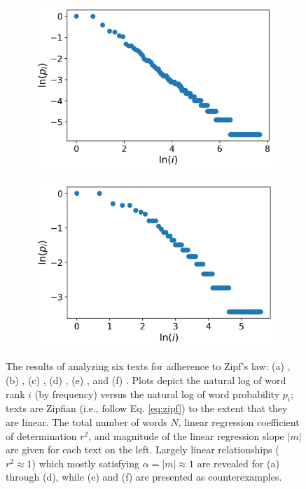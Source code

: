 \documentclass[10pt]{article}
\begin{document}
\begin{flushleft}
\begin{figure}[ht]
\begin{minipage}{0.65\linewidth}
\begin{subfigure}{0.32\linewidth}
            \includegraphics[width=0.99\linewidth]{images/parlost.png}
            \caption{}
        \end{subfigure}
        \begin{subfigure}{0.32\textwidth}
            \includegraphics[width=0.99\linewidth]{images/alcapone.png}
            \caption{}
        \end{subfigure}
    \end{minipage}
    \caption{The results of analyzing six texts for adherence to Zipf's law: (a) \textcite{Moby-Dick}, (b) \textcite{Ulysses}, (c) \textcite{trump}, (d) \textcite{feynman}, (e) \textcite{paradiselost}, and (f) \textcite{capone}. Plots depict the natural log of word rank $i$ (by frequency) versus the natural log of word probability $p_i$; texts are Zipfian (i.e., follow Eq. \ref{eq:zipf}) to the extent that they are linear. The total number of words $N$, linear regression coefficient of determination $r^2$, and magnitude of the linear regression slope $|m|$ are given for each text on the left. Largely linear relationships ($r^2 \approx 1$) which mostly satisfying $\alpha = |m| \approx 1$ are revealed for (a) through (d), while (e) and (f) are presented as counterexamples.}
    \label{fig:plots}
\end{figure}
    

\end{flushleft}
\end{document}
